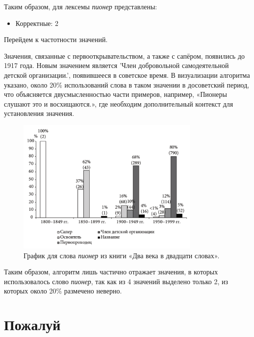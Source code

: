 Таким образом, для лексемы \textit{пионер} представлены:

\begin{itemize}
    \item Корректные: 2
\end{itemize}

Перейдем к частотности значений.

Значения, связанные с первооткрывательством, а также с сапёром, появились до 1917 года.
Новым значением является ’Член добровольной самодеятельной детской организации.’,
появившееся в советское время.
В визуализации алгоритма указано, около 20\% использований слова в таком значении
в досоветский период, что объясняется двусмысленностью части примеров,
например, «Пионеры слушают это и восхищаются.», где необходим дополнительный контекст
для установления значения.

\begin{figure}[H]
    \centering %
    \includegraphics[width=0.8\textwidth]{img/book/pioner/all}
    \caption{График для слова \textit{пионер} из книги «Два века в двадцати словах».}
\end{figure}

Таким образом, алгоритм лишь частично отражает значения, в которых использовалось
слово \textit{пионер}, так как из 4 значений выделено только 2, из которых
около 20\% размечено неверно.

\section*{Пожалуй}

